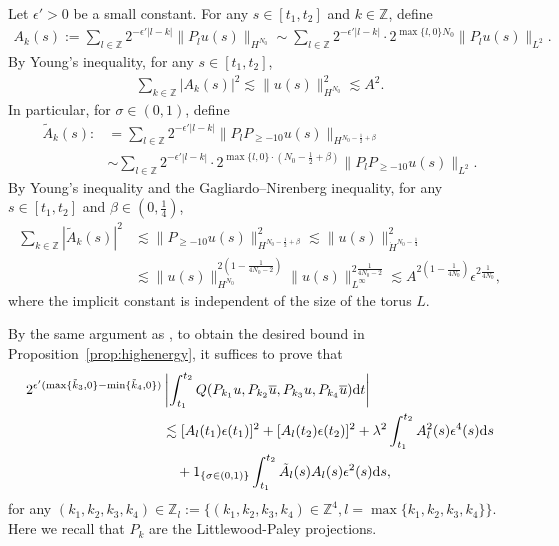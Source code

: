 \documentclass[UTF-8,reqno]{amsart}
\numberwithin{equation}{section}
\theoremstyle{definition}
\def\dif{{\mathord{{\rm d}}}}
\def\min{{\mathord{{\rm min}}}}
\def\geq{\geqslant}
\def\dif{{\mathord{{\rm d}}}}
\def\min{{\mathord{{\rm min}}}}
\def\geq{\geqslant}
\begin{document}
Let $\epsilon' > 0$ be a small constant. 
For any $s \in [t_1,t_2]$ and $k \in \mathbb{Z}$, define
    \begin{align*}
        A_k(s):=\sum_{l\in\mathbb{Z}}2^{-\epsilon'|l-k| }\|P_lu(s)\|_{H^{N_0}}\sim \sum_{l\in\mathbb{Z}}2^{-\epsilon'|l-k|}\cdot 2^{\max\{l, 0\}N_0}\|P_lu(s)\|_{L^2}.
    \end{align*}
   By Young's inequality, for any $s\in[t_1,t_2]$,
    \begin{align*}
        \sum_{k\in\mathbb{Z}} |A_k(s)|^2\lesssim\|u(s)\|_{H^{N_0}}^2\lesssim A^2 .
    \end{align*}
In particular, for $\sigma \in (0,1)$, define
    \begin{align*}
        \tilde{A}_k(s):&=\sum_{l\in\mathbb{Z}}2^{-\epsilon'|l-k| }\|P_lP_{\geq-10}u(s)\|_{H^{N_0-\frac12+\beta}}\\
        &\sim \sum_{l\in\mathbb{Z}}2^{-\epsilon'|l-k|}\cdot 2^{\max\{l, 0\}\cdot (N_0-\frac12+\beta)}\|P_lP_{\geq-10}u(s)\|_{L^2}.
    \end{align*}
   By Young's inequality and the Gagliardo--Nirenberg inequality, for any $s\in[t_1,t_2]$ and $\beta \in (0,\tfrac14)$,
    \begin{align*}
        \sum_{k\in\mathbb{Z}} |\tilde{A}_k(s)|^2&\lesssim\|P_{\geq-10}u(s)\|_{H^{N_0-\frac12+\beta}}^2\lesssim  \| u(s)\|_{\dot{H}^{N_0-\frac14}}^2\\
        &\lesssim \| u(s)\|_{{H}^{N_0 }}^{2(1-\frac1{4N_0-2})} \| u(s)\|_{L^\infty}^{ 2\frac1{4N_0-2}}\lesssim A^{2(1-\frac1{4N_0})}\epsilon^{2\frac1{4N_0}},
    \end{align*}
where the implicit constant is independent of the size of the torus $L$.

  By the same argument as \cite[Lemma 5.2, (5.20)]{DIP25a}, 
to obtain the desired bound in Proposition~\ref{prop:highenergy}, 
it suffices to prove that \begin{align}
2^{\epsilon'(\max\{\tilde k_3,0\}-\min\{\tilde k_4,0\})}&\left|\int_{t_1}^{t_2} Q(P_{k_1}u,P_{k_2}\overline u,P_{k_3}u,P_{k_4}\overline u)\dif t\right|\notag\\
&\lesssim [A_l(t_1)\epsilon(t_1)]^2+[A_l(t_2)\epsilon(t_2)]^2+\lambda^2\int_{t_1}^{t_2}A_l^2(s)\epsilon^4(s)\dif s\notag\\
&\quad+1_{\{\sigma\in(0,1)\}}\int_{t_1}^{t_2}\tilde{A}_l(s)A_l(s)\epsilon^2(s)\dif s,\label{bd:9.2mid}
\end{align}
for any $(k_1,k_2,k_3,k_4)\in\mathbb{Z}_l:=\{(k_1,k_2,k_3,k_4)\in\mathbb{Z}^4,l=\max\{k_1,k_2,k_3,k_4\} \}$.  Here we recall that $P_k$ are the  Littlewood-Paley projections.
\end{document}
